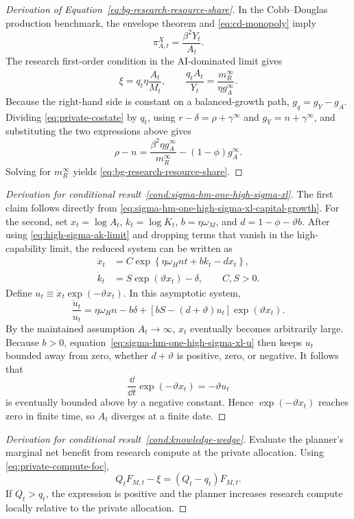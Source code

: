\begin{proof}[Derivation of Equation~\eqref{eq:bg-research-resource-share}]

In the Cobb--Douglas production benchmark, the envelope theorem and
\eqref{eq:cd-monopoly} imply
\[
    \pi^X_{A,t}=\frac{\beta^2Y_t}{A_t}.
\]
The research first-order condition in the AI-dominated limit gives
\[
    \xi=q_t\eta\frac{\dot A_t}{M_t},
    \qquad
    \frac{q_tA_t}{Y_t}
    =
    \frac{m_R^\infty}{\eta g_A^\infty}.
\]
Because the right-hand side is constant on a balanced-growth path,
$g_q=g_Y-g_A$. Dividing \eqref{eq:private-costate} by $q_t$, using
$r-\delta=\rho+\gamma^\infty$ and $g_Y=n+\gamma^\infty$, and substituting the
two expressions above gives
\[
    \rho-n
    =
    \frac{\beta^2\eta g_A^\infty}{m_R^\infty}
    -(1-\phi)g_A^\infty.
\]
Solving for $m_R^\infty$ yields
\eqref{eq:bg-research-resource-share}.
\end{proof}

\begin{proof}[Derivation for conditional result~\ref{cond:sigma-hm-one-high-sigma-xl}]
The first claim follows directly from
\eqref{eq:sigma-hm-one-high-sigma-xl-capital-growth}. For the second, set
$x_t=\log A_t$, $k_t=\log K_t$, $b=\eta\omega_M$, and
$d=1-\phi-\vartheta b$. After using \eqref{eq:high-sigma-ak-limit} and dropping terms that
vanish in the high-capability limit, the reduced system can be written as
\begin{align}
    \dot x_t
    &=C\exp\!\left\{\eta\omega_Hnt+bk_t-dx_t\right\},
    \label{eq:sigma-hm-one-high-sigma-xl-x}\\
    \dot k_t
    &=S\exp(\vartheta x_t)-\delta,
    \qquad C,S>0.
    \label{eq:sigma-hm-one-high-sigma-xl-k}
\end{align}
Define $u_t\equiv\dot x_t\exp(-\vartheta x_t)$. In this asymptotic system,
\begin{equation}
    \frac{\dot u_t}{u_t}
    =
    \eta\omega_Hn-b\delta
    +\left[bS-(d+\vartheta)u_t\right]\exp(\vartheta x_t).
    \label{eq:sigma-hm-one-high-sigma-xl-u}
\end{equation}
By the maintained assumption $A_t\to\infty$, $x_t$ eventually becomes arbitrarily
large. Because $b>0$, equation~\eqref{eq:sigma-hm-one-high-sigma-xl-u} then keeps $u_t$
bounded away from zero, whether $d+\vartheta$ is positive, zero, or negative. It follows that
\begin{equation}
    \frac{\dd}{\dd t}\exp(-\vartheta x_t)=-\vartheta u_t
\end{equation}
is eventually bounded above by a negative constant. Hence $\exp(-\vartheta x_t)$ reaches
zero in finite time, so $A_t$ diverges at a finite date.
\end{proof}

\begin{proof}[Derivation for conditional result~\ref{cond:knowledge-wedge}]
Evaluate the planner's marginal net benefit from research compute at the private
allocation. Using \eqref{eq:private-compute-foc},
\[
    Q_tF_{M,t}-\xi
    =
    (Q_t-q_t)F_{M,t}.
\]
If $Q_t>q_t$, the expression is positive and the planner increases research compute
locally relative to the private allocation.
\end{proof}
